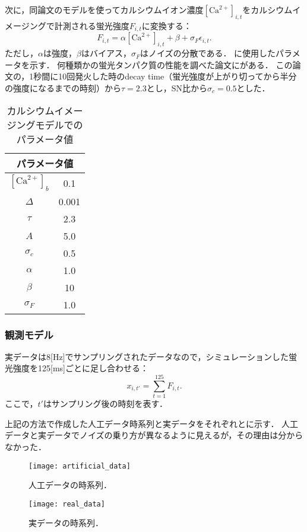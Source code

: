 次に，同論文のモデルを使ってカルシウムイオン濃度$[\text{Ca}^{2+}]_{i,t}$をカルシウムイメージングで計測される蛍光強度$F_{i,t}$に変換する：
\begin{equation}
	F_{i,t} = \alpha[\text{Ca}^{2+}]_{i,t} + \beta + \sigma_F \epsilon_{i,t}.
  \label{eq:intensity}
\end{equation}
ただし，$\alpha$は強度，$\beta$はバイアス，$\sigma_F$はノイズの分散である．
に使用したパラメータを示す．
何種類かの蛍光タンパク質の性能を調べた論文に\cite{Chen2013a}がある．
この論文の，1秒間に10回発火した時のdecay time（蛍光強度が上がり切ってから半分の強度になるまでの時刻）から$\tau = 2.3$とし，SN比から$\sigma_c = 0.5$とした．

\begin{table}[htb]
  \center
  \begin{tabular}{c|c}
		\multicolumn{2}{c}{パラメータ値} \\ \hline
		$[\text{Ca}^{2+}]_b$ & 0.1\\
		$\Delta$ & 0.001\\
		$\tau$ & 2.3\\
		$A$ & 5.0\\
		$\sigma_c$ & 0.5 \\
		$\alpha$ & 1.0\\
		$\beta$ & 10\\
		$\sigma_F$ & 1.0\\ \hline
  \end{tabular}
  \caption{カルシウムイメージングモデルでのパラメータ値}
  \label{tab:parameter2}
\end{table}

\subsubsection{観測モデル}
実データは8[Hz]でサンプリングされたデータなので，シミュレーションした蛍光強度を125[ms]ごとに足し合わせる：
\begin{equation}
  x_{i,t'} = \sum_{t=1}^{125} F_{i,t}.
  \label{eq:observation}
\end{equation}
ここで，$t'$はサンプリング後の時刻を表す．

上記の方法で作成した人工データ時系列と実データをそれぞれとに示す．
人工データと実データでノイズの乗り方が異なるように見えるが，その理由は分からなかった．
\begin{figure}[htbp]
    \begin{minipage}{0.5\hsize}
			\begin{center}
					\texttt{[image: artificial\_data]}
					\caption{人工データの時系列．}
					\label{fig:art}
			\end{center}
		\end{minipage}
    \begin{minipage}{0.5\hsize}
			\begin{center}
					\texttt{[image: real\_data]}
					\caption{実データの時系列．}
					\label{fig:dat}
			\end{center}
		\end{minipage}
\end{figure}

